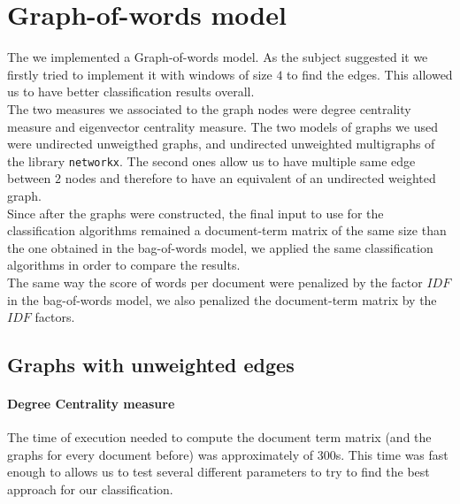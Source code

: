 \documentclass[11pt,a4paper]{article}
\begin{document}
\section{Graph-of-words model}
The we implemented a Graph-of-words model. As the subject suggested it we firstly tried to implement it with windows of size $4$ to find the edges. This allowed us to have better classification results overall. \\
The two measures we associated to the graph nodes were degree centrality measure and eigenvector centrality measure.
The two models of graphs we used were undirected unweigthed graphs, and undirected unweighted multigraphs of the library \texttt{networkx}. The second ones allow us to have multiple same edge between $2$ nodes and therefore to have an equivalent of an undirected weighted graph.\\
Since after the graphs were constructed, the final input to use for the classification algorithms remained a document-term matrix of the same size than the one obtained in the bag-of-words model, we applied the same classification algorithms in order to compare the results.\\
The same way the score of words per document were penalized by the factor $IDF$ in the bag-of-words model, we also penalized the document-term matrix by the $IDF$ factors.
\subsection{Graphs with unweighted edges}
\paragraph{Degree Centrality measure \newline}
The time of execution needed to compute the document term matrix (and the graphs for every document before) was approximately of 300s. This time was fast enough to allows us to test several different parameters to try to find the best approach for our classification.
\end{document}
